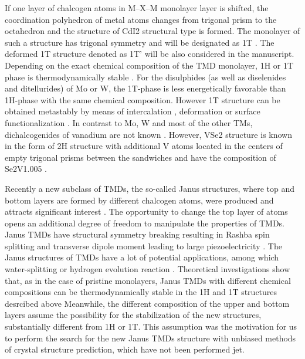 \documentclass[a4paperm]{article}
\begin{document}
If one layer of chalcogen atoms in M--X--M monolayer  layer is shifted, the coordination polyhedron of metal atoms changes from trigonal prism to the octahedron and the structure of CdI2 structural type is formed. 
The monolayer of such a structure has trigonal symmetry and will be designated as 1T \cite{huang2020recent}. 
The deformed 1T structure denoted as 1T' \cite{huang2020recent} will be also considered in the manuscript.
Depending on the exact chemical composition of the TMD monolayer, 1H or 1T phase is thermodynamically stable \cite{ataca2012stable}. 
For the disulphides (as well as diselenides and ditellurides) of Mo or W, the  1T-phase is less energetically favorable than 1H-phase with the same chemical composition. 
However 1T structure can be obtained metastably by means of intercalation \cite{kan2014structures, wang2014atomic}, deformation \cite{duerloo2014structural} or surface functionalization \cite{tang2015stabilization, voiry2015covalent}. 
In contrast to Mo, W and most of the other TMs, dichalcogenides of vanadium are not known \cite{murphy1977preparation, le1979elaboration}. 
However, VSe2 structure is known in the form of 2H structure with additional V atoms located in the centers of empty trigonal prisms between the sandwiches and have the composition of Se2V1.005 \cite{rigoult1982}.

Recently a new subclass of TMDs, the so-called Janus structures, where top and bottom layers are formed by different chalcogen atoms, were produced and attracts significant interest \cite{lu2017, zhang2017janus}. 
The opportunity to change the top layer of atoms opens an additional degree of freedom to manipulate the properties of TMDs. 
Janus TMDs have structural symmetry breaking \cite{li2017electronic, van2020first} resulting in Rashba spin splitting \cite{hu2018intrinsic} and transverse dipole moment leading to large piezoelectricity \cite{dong2017large, li2018recent}. 
The Janus structures of TMDs have a lot of potential applications, among which water-splitting \cite{xia2018universality, ma2018janus} or hydrogen evolution reaction \cite{er2018prediction, zhou2019janus}. 
Theoretical investigations show that, as in the case of pristine monolayers, Janus TMDs with different chemical compositions can be thermodynamically stable in the 1H and 1T structures desrcibed above
Meanwhile, the different composition of the upper and bottom layers assume the possibility for the stabilization of the new structures, substantially different from 1H or 1T.
This assumption was the motivation for us to perform the search for the new Janus TMDs structure with unbiased methods of crystal structure prediction, which have not been performed jet.
\end{document}
